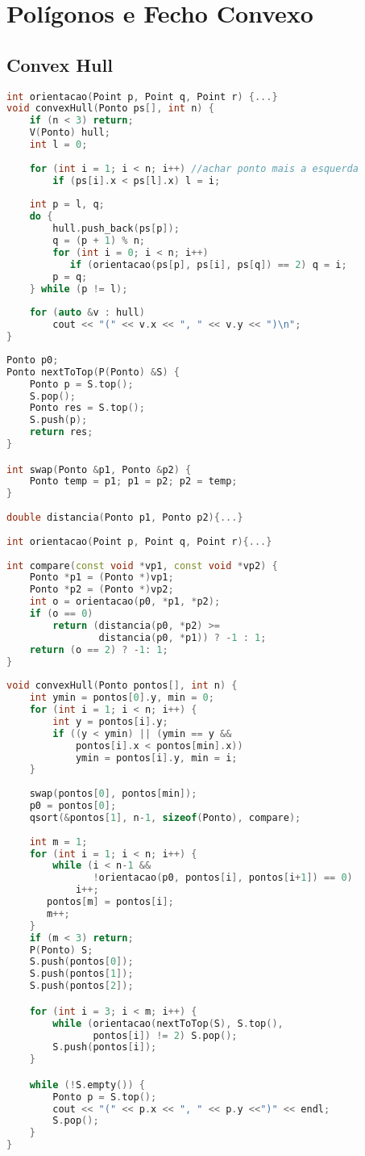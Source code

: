 \section{Polígonos e Fecho Convexo}
\subsection{Convex Hull}
\begin{lstlisting}[language=C++, title={Algoritmo de Jarvis}]
int orientacao(Point p, Point q, Point r) {...}
void convexHull(Ponto ps[], int n) {
    if (n < 3) return;
 	V(Ponto) hull;
    int l = 0;
    
    for (int i = 1; i < n; i++) //achar ponto mais a esquerda
    	if (ps[i].x < ps[l].x) l = i; 
    
    int p = l, q;
	do {
        hull.push_back(ps[p]);
        q = (p + 1) % n;
        for (int i = 0; i < n; i++)
           if (orientacao(ps[p], ps[i], ps[q]) == 2) q = i;
        p = q;
    } while (p != l);
    
    for (auto &v : hull)
        cout << "(" << v.x << ", " << v.y << ")\n";
}
\end{lstlisting}
\newpage
\begin{lstlisting}[language=C++, title={Algoritmo de Graham}]
Ponto p0; 
Ponto nextToTop(P(Ponto) &S) {
	Ponto p = S.top();
    S.pop();
    Ponto res = S.top();
    S.push(p);
    return res;
}

int swap(Ponto &p1, Ponto &p2) {
    Ponto temp = p1; p1 = p2; p2 = temp;
}
 
double distancia(Ponto p1, Ponto p2){...}
 
int orientacao(Point p, Point q, Point r){...}
 
int compare(const void *vp1, const void *vp2) {
    Ponto *p1 = (Ponto *)vp1;
    Ponto *p2 = (Ponto *)vp2;
    int o = orientacao(p0, *p1, *p2);
    if (o == 0)
    	return (distancia(p0, *p2) >= 
        		distancia(p0, *p1)) ? -1 : 1;
    return (o == 2) ? -1: 1;
}
 
void convexHull(Ponto pontos[], int n) {
    int ymin = pontos[0].y, min = 0;
    for (int i = 1; i < n; i++) {
    	int y = pontos[i].y;
    	if ((y < ymin) || (ymin == y && 
        	pontos[i].x < pontos[min].x))
    		ymin = pontos[i].y, min = i;
    }
    
    swap(pontos[0], pontos[min]);
    p0 = pontos[0];
    qsort(&pontos[1], n-1, sizeof(Ponto), compare);
    
    int m = 1;
    for (int i = 1; i < n; i++) {
    	while (i < n-1 && 
       		   !orientacao(p0, pontos[i], pontos[i+1]) == 0)
        	i++;
       pontos[m] = pontos[i];
       m++;
   	}
    if (m < 3) return;
    P(Ponto) S;
    S.push(pontos[0]);
    S.push(pontos[1]);
    S.push(pontos[2]);

    for (int i = 3; i < m; i++) {
        while (orientacao(nextToTop(S), S.top(), 
        	   pontos[i]) != 2) S.pop();
        S.push(pontos[i]);
    }

    while (!S.empty()) {
    	Ponto p = S.top();
    	cout << "(" << p.x << ", " << p.y <<")" << endl;
    	S.pop();
    }
}
\end{lstlisting}

